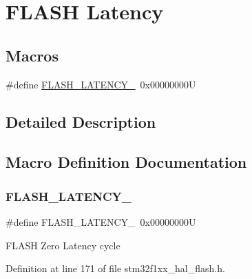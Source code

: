 \hypertarget{group___f_l_a_s_h___latency}{}\section{F\+L\+A\+SH Latency}
\label{group___f_l_a_s_h___latency}
\subsection*{Macros}
\begin{DoxyCompactItemize}
\item 
\#define \hyperlink{group___f_l_a_s_h___latency_ga1276f51e97dc9857ca261fae4eb890f3}{F\+L\+A\+S\+H\+\_\+\+L\+A\+T\+E\+N\+C\+Y\+\_}~0x00000000U
\end{DoxyCompactItemize}


\subsection{Detailed Description}


\subsection{Macro Definition Documentation}
\mbox{\label{group___f_l_a_s_h___latency_ga1276f51e97dc9857ca261fae4eb890f3}} 
\subsubsection{\texorpdfstring{F\+L\+A\+S\+H\+\_\+\+L\+A\+T\+E\+N\+C\+Y\+\_}{FLASH\_LATENCY\_0}}
{\footnotesize\ttfamily \#define F\+L\+A\+S\+H\+\_\+\+L\+A\+T\+E\+N\+C\+Y\+\_~0x00000000U}

F\+L\+A\+SH Zero Latency cycle 

Definition at line 171 of file stm32f1xx\+\_\+hal\+\_\+flash.\+h.

